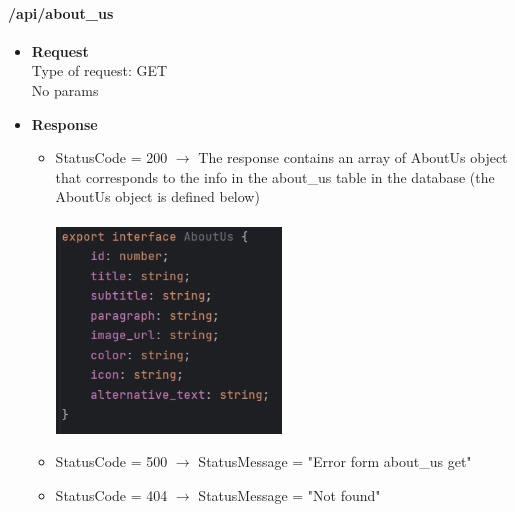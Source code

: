 \documentclass[11pt, letterpaper]{article}
\begin{document}
\paragraph{/api/about\_us}
\begin{itemize}
    \item \textbf{Request} \\ Type of request: GET \\ No params 
    \item \textbf{Response} \begin{itemize}
        \item StatusCode = 200 $\rightarrow$ The response contains an array of AboutUs object that corresponds to the info in the about\_us table in the database (the AboutUs object is defined below) \\ \\
            \includegraphics[width=6cm]{images/API/About_us.png}
        \item StatusCode = 500 $\rightarrow$ StatusMessage = "Error form about\_us get"
        \item StatusCode = 404 $\rightarrow$ StatusMessage = "Not found"
    \end{itemize} 
\end{itemize}
\end{document}
